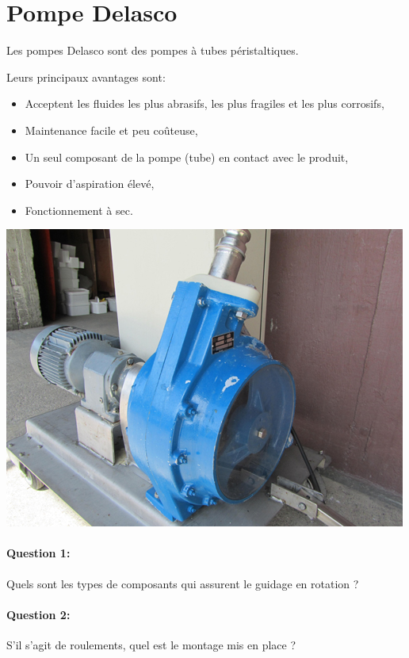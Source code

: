 

\section{Pompe Delasco}

\begin{minipage}{0.45\linewidth}

Les pompes Delasco sont des pompes à tubes péristaltiques.

Leurs principaux avantages sont:
\begin{itemize}
 \item Acceptent les fluides les plus abrasifs, les plus fragiles et les plus corrosifs,
 \item Maintenance facile et peu coûteuse,
 \item Un seul composant de la pompe (tube) en contact avec le produit,
 \item Pouvoir d'aspiration élevé,
 \item Fonctionnement à sec.
\end{itemize}

\end{minipage}
\hfill
\begin{minipage}{0.45\linewidth}
 \centering\includegraphics[width=0.8\linewidth]{img/pompe_delasco.jpg}
\end{minipage}

\paragraph{Question 1:} Quels sont les types de composants qui assurent le guidage en rotation ?

\paragraph{Question 2:} S'il s'agit de roulements, quel est le montage mis en place ?

